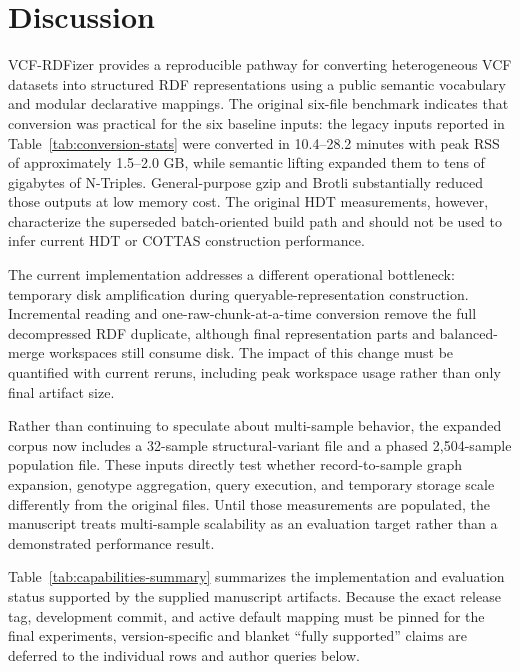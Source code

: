\documentclass[pdflatex,sn-mathphys-num]{sn-jnl}%
\newenvironment{revision}{\begingroup\color{revisionblue}}{\endgroup}%
\theoremstyle{thmstyleone}%
\theoremstyle{thmstyletwo}%
\theoremstyle{thmstylethree}%
\begin{document}
\section{Discussion}\label{sec4}
\begin{revision}
VCF-RDFizer provides a reproducible pathway for converting heterogeneous VCF datasets into structured RDF representations using a public semantic vocabulary and modular declarative mappings. 
The original six-file benchmark indicates that conversion was practical for the six baseline inputs: the legacy inputs reported in Table~\ref{tab:conversion-stats} were converted in 10.4--28.2 minutes with peak RSS of approximately 1.5--2.0 GB, while semantic lifting expanded them to tens of gigabytes of N-Triples. General-purpose gzip and Brotli substantially reduced those outputs at low memory cost. The original HDT measurements, however, characterize the superseded batch-oriented build path and should not be used to infer current HDT or COTTAS construction performance.

The current implementation addresses a different operational bottleneck: temporary disk amplification during queryable-representation construction. Incremental reading and one-raw-chunk-at-a-time conversion remove the full decompressed RDF duplicate, although final representation parts and balanced-merge workspaces still consume disk. The impact of this change must be quantified with current reruns, including peak workspace usage rather than only final artifact size.

Rather than continuing to speculate about multi-sample behavior, the expanded corpus now includes a 32-sample structural-variant file and a phased 2,504-sample population file. These inputs directly test whether record-to-sample graph expansion, genotype aggregation, query execution, and temporary storage scale differently from the original files. Until those measurements are populated, the manuscript treats multi-sample scalability as an evaluation target rather than a demonstrated performance result.
\end{revision}

\begin{revision}
Table~\ref{tab:capabilities-summary} summarizes the implementation and evaluation status supported by the supplied manuscript artifacts. Because the exact release tag, development commit, and active default mapping must be pinned for the final experiments, version-specific and blanket ``fully supported'' claims are deferred to the individual rows and author queries below.
\end{revision}
\end{document}
